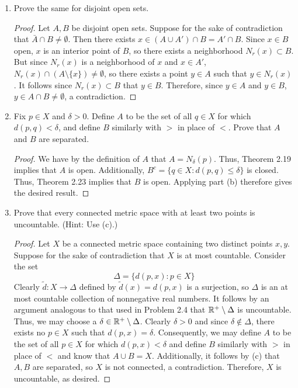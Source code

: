 \documentclass[../psets.tex]{subfiles}
\begin{document}
\begin{enumerate}[label={\textbf{\arabic*.}}]
\begin{enumerate}
        \item Prove the same for disjoint open sets.
        \begin{proof}
            Let $A,B$ be disjoint open sets. Suppose for the sake of contradiction that $\bar{A}\cap B\neq\emptyset$. Then there exists $x\in(A\cup A')\cap B=A'\cap B$. Since $x\in B$ open, $x$ is an interior point of $B$, so there exists a neighborhood $N_r(x)\subset B$. But since $N_r(x)$ is a neighborhood of $x$ and $x\in A'$, $N_r(x)\cap(A\setminus\{x\})\neq\emptyset$, so there exists a point $y\in A$ such that $y\in N_r(x)$. It follows since $N_r(x)\subset B$ that $y\in B$. Therefore, since $y\in A$ and $y\in B$, $y\in A\cap B\neq\emptyset$, a contradiction.
        \end{proof}
        \item Fix $p\in X$ and $\delta>0$. Define $A$ to be the set of all $q\in X$ for which $d(p,q)<\delta$, and define $B$ similarly with $>$ in place of $<$. Prove that $A$ and $B$ are separated.
        \begin{proof}
            We have by the definition of $A$ that $A=N_\delta(p)$. Thus, Theorem 2.19 implies that $A$ is open. Additionally, $B^c=\{q\in X:d(p,q)\leq \delta\}$ is closed. Thus, Theorem 2.23 implies that $B$ is open. Applying part (b) therefore gives the desired result.
        \end{proof}
        \item Prove that every connected metric space with at least two points is uncountable. (Hint: Use (c).)
        \begin{proof}
            Let $X$ be a connected metric space containing two distinct points $x,y$. Suppose for the sake of contradiction that $X$ is at most countable. Consider the set
            \begin{equation*}
                \Delta = \{d(p,x):p\in X\}
            \end{equation*}
            Clearly $\tilde{d}:X\to\Delta$ defined by $\tilde{d}(x)=d(p,x)$ is a surjection, so $\Delta$ is an at most countable collection of nonnegative real numbers. It follows by an argument analogous to that used in Problem 2.4 that $\mathbb{R}^+\setminus\Delta$ is uncountable. Thus, we may choose a $\delta\in\mathbb{R}^+\setminus\Delta$. Clearly $\delta>0$ and since $\delta\notin\Delta$, there exists no $p\in X$ such that $d(p,x)=\delta$. Consequently, we may define $A$ to be the set of all $p\in X$ for which $d(p,x)<\delta$ and define $B$ similarly with $>$ in place of $<$ and know that $A\cup B=X$. Additionally, it follows by (c) that $A,B$ are separated, so $X$ is not connected, a contradiction. Therefore, $X$ is uncountable, as desired.

\end{proof}
\end{enumerate}
\end{enumerate}
\end{document}
